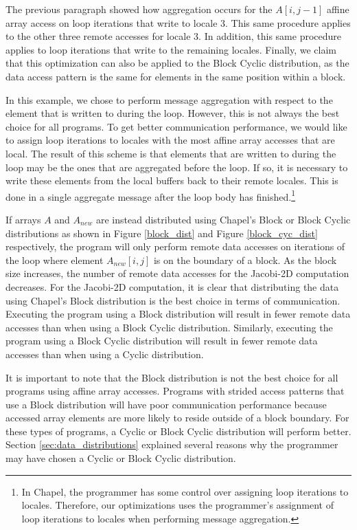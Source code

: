 The previous paragraph showed how aggregation occurs for the $A[i, j-1]$ affine array access on loop iterations that write to locale 3. This same procedure applies to the other three remote accesses for locale 3. In addition, this same procedure applies to loop iterations that write to the remaining locales. Finally, we claim that this optimization can also be applied to the Block Cyclic distribution, as the data access pattern is the same for elements in the same position within a block. 

In this example, we chose to perform message aggregation with respect to the element that is written to during the loop. However, this is not always the best choice for all programs. To get better communication performance, we would like to assign loop iterations to locales with the most affine array accesses that are local. The result of this scheme is that elements that are written to during the loop may be the ones that are aggregated before the loop. If so, it is necessary to write these elements from the local buffers back to their remote locales. This is done in a single aggregate message after the loop body has finished.\footnote{In Chapel, the programmer has some control over assigning loop iterations to locales. Therefore, our optimizations uses the programmer's assignment of loop iterations to locales when performing message aggregation.} 

If arrays $A$ and $A_{new}$ are instead distributed using Chapel's Block or Block Cyclic distributions as shown in Figure \ref{block_dist} and Figure \ref{block_cyc_dist} respectively, the program will only perform remote data accesses on iterations of the loop where element $A_{new}[i, j]$ is on the boundary of a block. As the block size increases, the number of remote data accesses for the Jacobi-2D computation decreases. For the Jacobi-2D computation, it is clear that distributing the data using Chapel's Block distribution is the best choice in terms of communication. Executing the program using a Block distribution will result in fewer remote data accesses than when using a Block Cyclic distribution. Similarly, executing the program using a Block Cyclic distribution will result in fewer remote data accesses than when using a Cyclic distribution. 

It is important to note that the Block distribution is not the best choice for all programs using affine array accesses. Programs with strided access patterns that use a Block distribution will have poor communication performance because accessed array elements are more likely to reside outside of a block boundary. For these types of programs, a Cyclic or Block Cyclic distribution will perform better. Section \ref{sec:data_distributions} explained several reasons why the programmer may have chosen a Cyclic or Block Cyclic distribution.


